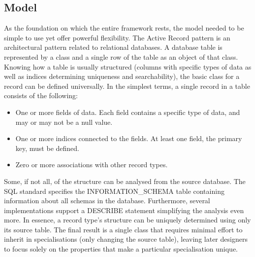 \subsection{Model}
\label{design_tech_model}
As the foundation on which the entire framework rests, the model needed to be simple to use yet offer powerful flexibility. The Active Record pattern is an architectural pattern related to relational databases. A database table is represented by a class and a single row of the table as an object of that class. Knowing how a table is usually structured (columns with specific types of data as well as indices determining uniqueness and searchability), the basic class for a record can be defined universally.
In the simplest terms, a single record in a table consists of the following:
\begin{itemize}
    \item One or more fields of data. Each field contains a specific type of data, and may or may not be a null value.
    \item One or more indices connected to the fields. At least one field, the primary key, must be defined.
    \item Zero or more associations with other record types.
\end{itemize}
Some, if not all, of the structure can be analysed from the source database. The SQL standard specifies the INFORMATION\_SCHEMA table containing information about all schemas in the database. Furthermore, several implementations support a DESCRIBE statement simplifying the analysis even more. In essence, a record type's structure can be uniquely determined using only its source table.
The final result is a single class that requires minimal effort to inherit in specialisations (only changing the source table), leaving later designers to focus solely on the properties that make a particular specialisation unique.

